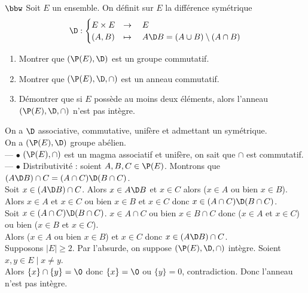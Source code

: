 \documentclass[11pt]{article}
\begin{document}
\pagebreak

\begin{exercice}{$\bbw$}{}
    Soit $E$ un ensemble. On définit sur $E$ la différence symétrique
    \begin{equation*}
        \D : \begin{cases}
            E \times E &\to \quad E\\
            (A,B) &\mapsto \quad A\D B = (A\cup B) \setminus (A \cap B) 
        \end{cases}
    \end{equation*}
    \begin{enumerate}
        \item Montrer que $(\P(E),\D)$ est un groupe commutatif.
        \item Montrer que $(\P(E),\D,\cap)$ est un anneau commutatif.
        \item Démontrer que si $E$ possède au moins deux éléments, alors l'anneau $(\P(E),\D,\cap)$ n'est pas intègre.
    \end{enumerate}
    \tcblower
     On a $\D$ associative, commutative, unifère et admettant un symétrique.\\
     On a $(\P(E),\D)$ groupe abélien.\\
    --- $\bullet$ $(\P(E), \cap)$ est un magma associatif et unifère, on sait que $\cap$ est commutatif.\\
    --- $\bullet$ Distributivité : soient $A,B,C\in\P(E)$. Montrons que $(A\D B)\cap C=(A\cap C)\D(B\cap C)$.\\
    \boxed{\subset} Soit $x\in(A\D B)\cap C$. Alors $x\in A\D B$ et $x\in C$ alors ($x\in A$ ou bien $x\in B$).\\
    Alors $x\in A$ et $x\in C$ ou bien $x\in B$ et $x\in C$ donc $x\in(A\cap C)\D(B\cap C)$.\\
    \boxed{\supset} Soit $x\in(A\cap C)\D(B\cap C)$. $x\in A\cap C$ ou bien $x\in B\cap C$ donc ($x\in A$ et $x\in C$) ou bien ($x\in B$ et $x\in C$).\\
    Alors ($x\in A$ ou bien $x\in B$) et $x\in C$ donc $x\in (A\D B)\cap C$.\\
     Supposons $|E|\geq2$. Par l'absurde, on suppose $(\P(E),\D,\cap)$ intègre. Soient $x,y\in E\mid x\neq y$.\\
    Alors $\{x\}\cap\{y\}=\0$ donc $\{x\}=\0$ ou $\{y\}=0$, contradiction. Donc l'anneau n'est pas intègre.
\end{exercice}
\end{document}
